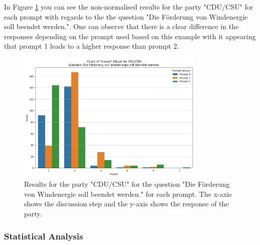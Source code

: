 \documentclass[12pt]{article}
\begin{document}
In Figure \ref{fig:cdu_results} you can see the non-normalised results for the party "CDU/CSU" for each prompt with regards to the the question "Die Förderung von Windenergie soll beendet werden.". One can observe that there is a clear difference in the responses depending on the prompt used based on this example with it appearing that prompt 1 leads to a higher response than prompt 2.

\begin{figure}[h!]
\centering
\includegraphics[width=0.8\textwidth]{img/cdu_results.png}
\caption{Results for the party "CDU/CSU" for the question "Die Förderung von Windenergie soll beendet werden." for each prompt. The x-axis shows the discussion step and the y-axis shows the response of the party.}
\label{fig:cdu_results}
\end{figure}

\subsubsection{Statistical Analysis}
\end{document}
